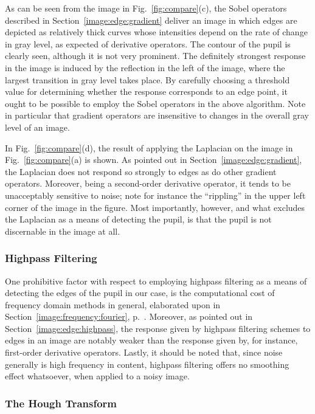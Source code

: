 As can be seen from the image in Fig.~\ref{fig:compare}(c), the Sobel
operators described in Section~\ref{image:edge:gradient} deliver an
image in which edges are depicted as relatively thick curves whose
intensities depend on the rate of change in gray level, as expected of
derivative operators.  The contour of the pupil is clearly seen,
although it is not very prominent.  The definitely strongest response
in the image is induced by the reflection in the left of the image,
where the largest transition in gray level takes place.  By carefully
choosing a threshold value for determining whether the response
corresponds to an edge point, it ought to be possible to employ the
Sobel operators in the above algorithm.  Note in particular that
gradient operators are insensitive to changes in the overall gray
level of an image.

In Fig.~\ref{fig:compare}(d), the result of applying the Laplacian on
the image in Fig.~\ref{fig:compare}(a) is shown.  As pointed out in
Section~\ref{image:edge:gradient}, the Laplacian does not respond so
strongly to edges as do other gradient operators.  Moreover, being a
second-order derivative operator, it tends to be unacceptably
sensitive to noise; note for instance the ``rippling'' in the upper
left corner of the image in the figure.  Most importantly, however,
and what excludes the Laplacian as a means of detecting the pupil, is
that the pupil is not discernable in the image at all.

\subsubsection{Highpass Filtering}

One prohibitive factor with respect to employing highpass filtering as
a means of detecting the edges of the pupil in our case, is the
computational cost of frequency domain methods in general, elaborated
upon in Section~\ref{image:frequency:fourier}, p.~\pageref{pg:fft:O}.
Moreover, as pointed out in Section~\ref{image:edge:highpass}, the
response given by highpass filtering schemes to edges in an image are
notably weaker than the response given by, for instance, first-order
derivative operators.  Lastly, it should be noted that, since noise
generally is high frequency in content, highpass filtering offers no
smoothing effect whatsoever, when applied to a noisy image.

\subsubsection{The Hough Transform}

